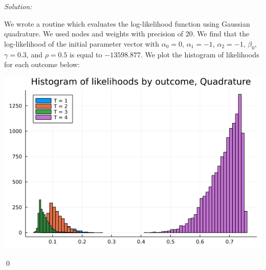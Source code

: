\documentclass[12pt]{article}
\newenvironment{problem}[2][Problem]{\begin{trivlist}
\item[\hskip \labelsep {\bfseries #1}\hskip \labelsep {\bfseries #2.}]}{\end{trivlist}}
\newenvironment{sol}
    {\emph{Solution:}
    }
    {
    \qed
    }
\begin{document}
\begin{problem}{1}
\end{problem}
\begin{sol}
    We wrote a routine which evaluates the log-likelihood function using Gaussian quadrature. We used nodes and weights with precision of 20. We find that the log-likelihood of the initial parameter vector with $\alpha_0 = 0$, $\alpha_1 = -1$, $\alpha_2 = -1$, $\beta_0$, $\gamma = 0.3$, and $\rho = 0.5$ is equal to $-13598.877$. We plot the histogram of likelihoods for each outcome below:
    \begin{center}
        \includegraphics[scale=0.5]{Quadrature_ll.png}
    \end{center}
\end{sol}
\begin{problem}{2}
\end{problem}
\end{document}
